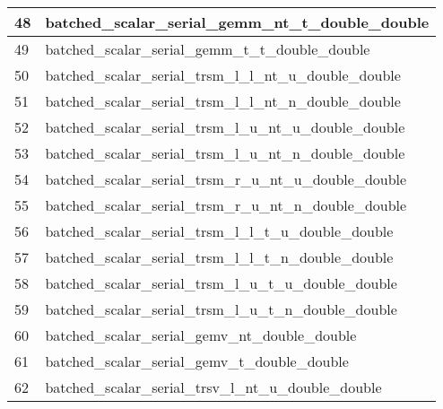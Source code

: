 \begin{table}[!htbp]
{            \hspace{1cm}

            \begin{tabular}{|>{\columncolor[HTML]{34FF34}}l |l|}
            \hline
            \cellcolor[HTML]{FE0000}48 & batched\_scalar\_serial\_gemm\_nt\_t\_double\_double                \\ \hline
            \cellcolor[HTML]{FE0000}49 & batched\_scalar\_serial\_gemm\_t\_t\_double\_double                 \\ \hline
            50                         & batched\_scalar\_serial\_trsm\_l\_l\_nt\_u\_double\_double          \\ \hline
            \cellcolor[HTML]{FE0000}51 & batched\_scalar\_serial\_trsm\_l\_l\_nt\_n\_double\_double          \\ \hline
            52                         & batched\_scalar\_serial\_trsm\_l\_u\_nt\_u\_double\_double          \\ \hline
            \cellcolor[HTML]{FE0000}53 & batched\_scalar\_serial\_trsm\_l\_u\_nt\_n\_double\_double          \\ \hline
            54                         & batched\_scalar\_serial\_trsm\_r\_u\_nt\_u\_double\_double          \\ \hline
            \cellcolor[HTML]{FE0000}55 & batched\_scalar\_serial\_trsm\_r\_u\_nt\_n\_double\_double          \\ \hline
            \cellcolor[HTML]{FF00FF}56 & batched\_scalar\_serial\_trsm\_l\_l\_t\_u\_double\_double           \\ \hline
            \cellcolor[HTML]{FF00FF}57 & batched\_scalar\_serial\_trsm\_l\_l\_t\_n\_double\_double           \\ \hline
            \cellcolor[HTML]{FF00FF}58 & batched\_scalar\_serial\_trsm\_l\_u\_t\_u\_double\_double           \\ \hline
            \cellcolor[HTML]{FF00FF}59 & batched\_scalar\_serial\_trsm\_l\_u\_t\_n\_double\_double           \\ \hline
            60                         & batched\_scalar\_serial\_gemv\_nt\_double\_double                   \\ \hline
            61                         & batched\_scalar\_serial\_gemv\_t\_double\_double                    \\ \hline
            \cellcolor[HTML]{FE0000}62 & batched\_scalar\_serial\_trsv\_l\_nt\_u\_double\_double             \\ \hline

\end{tabular}}
\end{table}

